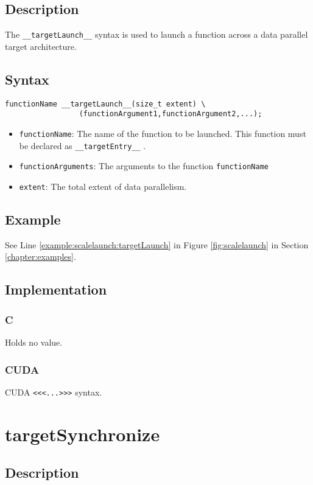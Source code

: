 \subsection{Description}

The \verb+__targetLaunch__+ syntax is used to launch a function across a data parallel target architecture.

\subsection{Syntax}
\begin{verbatim}
functionName __targetLaunch__(size_t extent) \
                 (functionArgument1,functionArgument2,...);
\end{verbatim}

\begin{itemize}
\item \verb+functionName+: The name of the function to be launched. This function must be declared as \verb+__targetEntry__+ .
\item \verb+functionArguments+: The arguments to the function \verb+functionName+  
\item \verb+extent+: The total extent of data parallelism.
\end{itemize}


\subsection{Example}
See Line \ref{example:scalelaunch:targetLaunch} in Figure \ref{fig:scalelaunch} in Section \ref{chapter:examples}.

\subsection{Implementation}
\subsubsection{C}
Holds no value.
\subsubsection{CUDA}
CUDA \verb+<<<...>>>+ syntax.

\newpage
\section{targetSynchronize}

\subsection{Description}


